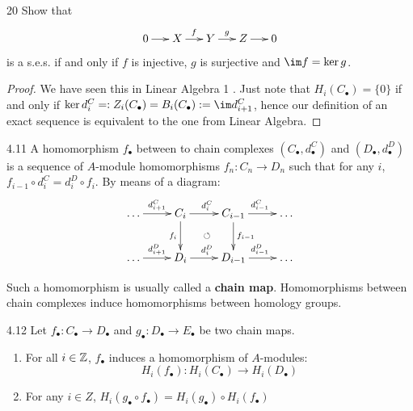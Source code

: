 \documentclass[twoside = false,	%
		headsepline,		%
		parskip = true,
		]{scrbook}						%
\begin{document}
        \begin{exercise}{}{20}
            Show that
            \begin{equation*}
                \xymatrix@C=15pt {
                    0 \ar[r] & X \ar[r]^f & Y \ar[r]^g & Z \ar[r] & 0
                }
            \end{equation*}
            is a s.e.s. if and only if $f$ is injective, $g$ is surjective and $\im f = \ker g$.
        \end{exercise}
        \begin{proof}
            We have seen this in Linear Algebra 1 \cite{LA}. Just note that $H_i(C_\bullet) = \{0\}$ if and only if $\ker d_i^C =: Z_i(C_\bullet) = B_i(C_\bullet) := \im d_{i+1}^C$, hence our definition of an exact sequence is equivalent to the one from Linear Algebra.
        \end{proof}

        \begin{definition}{}{4.11}
            A homomorphism $f_\bullet$ between to chain complexes $(C_\bullet,d_\bullet^C)$ and $(D_\bullet,d_\bullet^D)$ is a sequence of $A$-module homomorphisms $f_n: C_n \to D_n$ such that for any $i$, $f_{i-1} \circ d_i^C = d_i^D \circ f_i$. By means of a diagram:
            \begin{equation*}
            \xymatrix {
                \dots \ar[r]^{d_{i+1}^C} & C_i \ar[r]^{d_i^C} \ar[d]_{f_i} & C_{i-1} \ar[r]^{d_{i-1}^C} \ar[d]^{f_{i-1}} & \dots \\
                \dots \ar[r]^{d_{i+1}^D} & D_i \ar[r]^{d_{i}^D} \ar@{}[ur]|{\circlearrowleft} & D_{i-1} \ar[r]^{d_{i-1}^D}& \dots 
            }
            \end{equation*}
        \end{definition}
        Such a homomorphism is usually called a \textbf{chain map}. Homomorphisms between chain complexes induce homomorphisms between homology groups.

        \begin{lemma}{}{4.12}
            Let $f_\bullet: C_\bullet \to D_\bullet$ and $g_\bullet: D_\bullet \to E_\bullet$ be two chain maps.
            \begin{enumerate}
                \item For all $i \in \mathbb Z$, $f_\bullet$ induces a homomorphism of $A$-modules:
                    \begin{equation*}
                        H_i(f_\bullet): H_i(C_\bullet) \to H_i(D_\bullet)
                    \end{equation*}
                \item For any $i \in Z$, $H_i(g_\bullet \circ f_\bullet) = H_i(g_\bullet) \circ H_i(f_\bullet)$
            \end{enumerate}
        \end{lemma}
\end{document}
